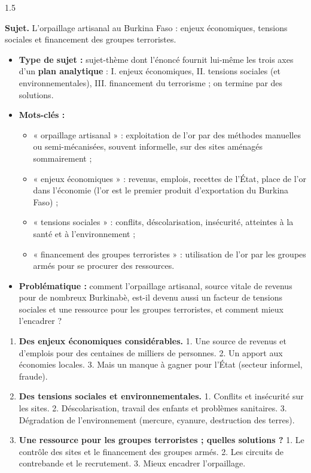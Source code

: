 \documentclass[12pt]{article}
\begin{document}
\begin{spacing}{1.5}

\noindent\textbf{Sujet.} L'orpaillage artisanal au Burkina Faso : enjeux économiques, tensions sociales et financement des groupes terroristes.


\begin{itemize}
\item \textbf{Type de sujet :} sujet-thème dont l'énoncé fournit lui-même les trois axes d'un \textbf{plan analytique} : I. enjeux économiques, II. tensions sociales (et environnementales), III. financement du terrorisme ; on termine par des solutions.
\item \textbf{Mots-clés :}
  \begin{itemize}
  \item « orpaillage artisanal » : exploitation de l'or par des méthodes manuelles ou semi-mécanisées, souvent informelle, sur des sites aménagés sommairement ;
  \item « enjeux économiques » : revenus, emplois, recettes de l'État, place de l'or dans l'économie (l'or est le premier produit d'exportation du Burkina Faso) ;
  \item « tensions sociales » : conflits, déscolarisation, insécurité, atteintes à la santé et à l'environnement ;
  \item « financement des groupes terroristes » : utilisation de l'or par les groupes armés pour se procurer des ressources.
  \end{itemize}
\item \textbf{Problématique :} comment l'orpaillage artisanal, source vitale de revenus pour de nombreux Burkinabè, est-il devenu aussi un facteur de tensions sociales et une ressource pour les groupes terroristes, et comment mieux l'encadrer ?
\end{itemize}


\begin{enumerate}
\item[I.] \textbf{Des enjeux économiques considérables.} 1. Une source de revenus et d'emplois pour des centaines de milliers de personnes. 2. Un apport aux économies locales. 3. Mais un manque à gagner pour l'État (secteur informel, fraude).
\item[II.] \textbf{Des tensions sociales et environnementales.} 1. Conflits et insécurité sur les sites. 2. Déscolarisation, travail des enfants et problèmes sanitaires. 3. Dégradation de l'environnement (mercure, cyanure, destruction des terres).
\item[III.] \textbf{Une ressource pour les groupes terroristes ; quelles solutions ?} 1. Le contrôle des sites et le financement des groupes armés. 2. Les circuits de contrebande et le recrutement. 3. Mieux encadrer l'orpaillage.
\end{enumerate}


\end{spacing}
\end{document}
